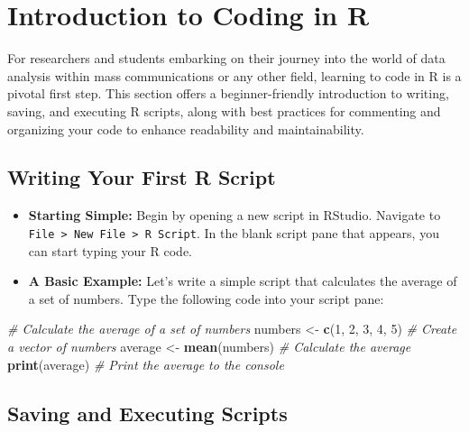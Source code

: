 \documentclass[
]{book}
\newenvironment{Shaded}{\begin{snugshade}}{\end{snugshade}}
\newcommand{\CommentTok}[1]{\textcolor[rgb]{0.56,0.35,0.01}{\textit{#1}}}
\newcommand{\DecValTok}[1]{\textcolor[rgb]{0.00,0.00,0.81}{#1}}
\newcommand{\FunctionTok}[1]{\textcolor[rgb]{0.13,0.29,0.53}{\textbf{#1}}}
\newcommand{\NormalTok}[1]{#1}
\newcommand{\OtherTok}[1]{\textcolor[rgb]{0.56,0.35,0.01}{#1}}
\begin{document}
\hypertarget{introduction-to-coding-in-r}{%
\section{Introduction to Coding in R}\label{introduction-to-coding-in-r}}

For researchers and students embarking on their journey into the world of data analysis within mass communications or any other field, learning to code in R is a pivotal first step. This section offers a beginner-friendly introduction to writing, saving, and executing R scripts, along with best practices for commenting and organizing your code to enhance readability and maintainability.

\hypertarget{writing-your-first-r-script}{%
\subsection*{Writing Your First R Script}\label{writing-your-first-r-script}}

\begin{itemize}
\item
  \textbf{Starting Simple:} Begin by opening a new script in RStudio. Navigate to \texttt{File\ \textgreater{}\ New\ File\ \textgreater{}\ R\ Script}. In the blank script pane that appears, you can start typing your R code.
\item
  \textbf{A Basic Example:} Let's write a simple script that calculates the average of a set of numbers. Type the following code into your script pane:
\end{itemize}

\begin{Shaded}
\begin{Highlighting}[]
\CommentTok{\# Calculate the average of a set of numbers}
\NormalTok{numbers }\OtherTok{\textless{}{-}} \FunctionTok{c}\NormalTok{(}\DecValTok{1}\NormalTok{, }\DecValTok{2}\NormalTok{, }\DecValTok{3}\NormalTok{, }\DecValTok{4}\NormalTok{, }\DecValTok{5}\NormalTok{) }\CommentTok{\# Create a vector of numbers}
\NormalTok{average }\OtherTok{\textless{}{-}} \FunctionTok{mean}\NormalTok{(numbers) }\CommentTok{\# Calculate the average}
\FunctionTok{print}\NormalTok{(average) }\CommentTok{\# Print the average to the console}
\end{Highlighting}
\end{Shaded}

\hypertarget{saving-and-executing-scripts}{%
\subsection*{Saving and Executing Scripts}\label{saving-and-executing-scripts}}
\end{document}
